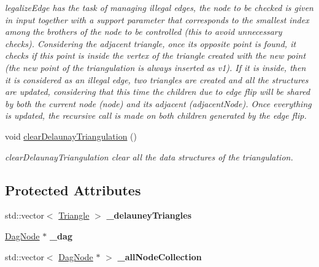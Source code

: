 \begin{DoxyCompactItemize}
\begin{DoxyCompactList}\small\item\em legalize\+Edge has the task of managing illegal edges, the node to be checked is given in input together with a support parameter that corresponds to the smallest index among the brothers of the node to be controlled (this to avoid unnecessary checks). Considering the adjacent triangle, once its opposite point is found, it checks if this point is inside the vertex of the triangle created with the new point (the new point of the triangulation is always inserted as v1). If it is inside, then it is considered as an illegal edge, two triangles are created and all the structures are updated, considering that this time the children due to edge flip will be shared by both the current node (node) and its adjacent (adjacent\+Node). Once everything is updated, the recursive call is made on both children generated by the edge flip. \end{DoxyCompactList}\item 
\mbox{\label{classDelauneyTriangulation_aa14181112af52cf4ad693d8f0a96562d}} 
void \hyperlink{classDelauneyTriangulation_aa14181112af52cf4ad693d8f0a96562d}{clear\+Delaunay\+Triangulation} ()
\begin{DoxyCompactList}\small\item\em clear\+Delaunay\+Triangulation clear all the data structures of the triangulation. \end{DoxyCompactList}\end{DoxyCompactItemize}
\subsection*{Protected Attributes}
\begin{DoxyCompactItemize}
\item 
\mbox{\label{classDelauneyTriangulation_a2cfa49d38e0544d900aa54e76c684fed}} 
std\+::vector$<$ \hyperlink{classTriangle}{Triangle} $>$ {\bfseries \+\_\+delauney\+Triangles}
\item 
\mbox{\label{classDelauneyTriangulation_a516bd7114b240144e6308c1e26e89aab}} 
\hyperlink{classDagNode}{Dag\+Node} $\ast$ {\bfseries \+\_\+dag}
\item 
\mbox{\label{classDelauneyTriangulation_a192bde5cb071521ae0baa59e903ab229}} 
std\+::vector$<$ \hyperlink{classDagNode}{Dag\+Node} $\ast$ $>$ {\bfseries \+\_\+all\+Node\+Collection}
\end{DoxyCompactItemize}


